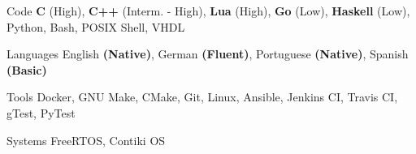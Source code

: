
\begin{cvskills}
  \cvskill
    {Code} %
    {\textbf{C} (High),
     \textbf{C++} (Interm. - High),
     \textbf{Lua} (High),
     \textbf{Go} (Low), 
     \textbf{Haskell} (Low), 
     Python,
     Bash, POSIX Shell,
     VHDL}

  \cvskill
    {Languages} %
    {English \textbf{(Native)}, German \textbf{(Fluent)}, Portuguese \textbf{(Native)}, Spanish \textbf{(Basic)}} %

  \cvskill
    {Tools} %
    {Docker, GNU Make, CMake, Git, Linux, Ansible, Jenkins CI, Travis CI, gTest, PyTest} %

  \cvskill
    {Systems} %
    {FreeRTOS, Contiki OS} %
\end{cvskills}
